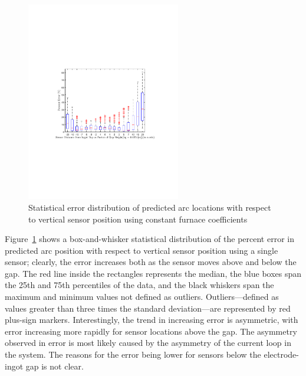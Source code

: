 \documentclass[onehalf,11pt]{beavtex}
\begin{document}
\begin{figure}[htbp]
	\centering
	\includegraphics[width=0.6\textwidth]{constant_furnace_coef_sensorheight_error.pdf}
	\caption{Statistical error distribution of predicted arc locations with respect to vertical sensor position using constant furnace coefficients}
	\label{fig:avg_error}
\end{figure}

Figure~\ref{fig:avg_error} shows a box-and-whisker statistical distribution of the percent error in predicted arc position with respect to vertical sensor position using a single sensor; clearly, the error increases both as the sensor moves above and below the gap.
The red line inside the rectangles represents the median, the blue boxes span the 25th and 75th percentiles of the data, and the black whiskers span the maximum and minimum values not defined as outliers.
Outliers---defined as values greater than three times the standard deviation---are represented by red plus-sign markers.
Interestingly, the trend in increasing error is asymmetric, with error increasing more rapidly for sensor locations above the gap.
The asymmetry observed in error is most likely caused by the asymmetry of the current loop in the system. 
The reasons for the error being lower for sensors below the electrode-ingot gap is not clear. 
\end{document}
